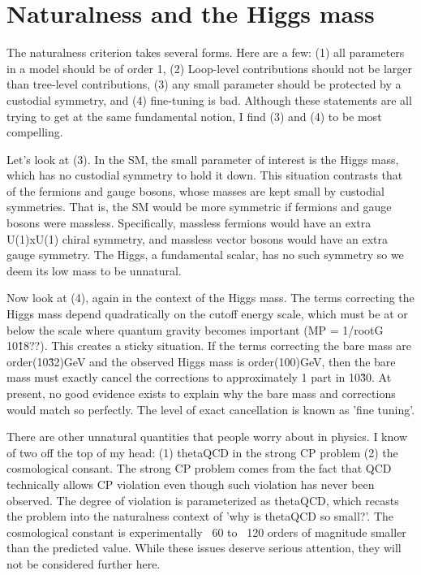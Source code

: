 \documentclass[12pt]{article}
\begin{document}
\section{Naturalness and the Higgs mass}
    The naturalness criterion takes several forms. Here are a few: (1) all parameters in a model should be of order 1, (2) Loop-level contributions should not be larger than tree-level contributions, (3) any small parameter should be protected by a custodial symmetry, and (4) fine-tuning is bad. Although these statements are all trying to get at the same fundamental notion, I find (3) and (4) to be most compelling.

    Let's look at (3). In the SM, the small parameter of interest is the Higgs mass, which has no custodial symmetry to hold it down. This situation contrasts that of the fermions and gauge bosons, whose masses are kept small by custodial symmetries. That is, the SM would be more symmetric if fermions and gauge bosons were massless. Specifically, massless fermions would have an extra U(1)xU(1) chiral symmetry, and massless vector bosons would have an extra gauge symmetry. The Higgs, a fundamental scalar, has no such symmetry so we deem its low mass to be unnatural.

    Now look at (4), again in the context of the Higgs mass. The terms correcting the Higgs mass depend quadratically on the cutoff energy scale, which must be at or below the scale where quantum gravity becomes important (MP = 1/rootG ~ 10\^18??). This creates a sticky situation. If the terms correcting the bare mass are order(10\^32)GeV and the observed Higgs mass is order(100)GeV, then the bare mass must exactly cancel the corrections to approximately 1 part in 10\^30. At present, no good evidence exists to explain why the bare mass and corrections would match so perfectly. The level of exact cancellation is known as 'fine tuning'.

    There are other unnatural quantities that people worry about in physics. I know of two off the top of my head: (1) thetaQCD in the strong CP problem (2) the cosmological consant. The strong CP problem comes from the fact that QCD technically allows CP violation even though such violation has never been observed. The degree of violation is parameterized as thetaQCD, which recasts the problem into the naturalness context of 'why is thetaQCD so small?'. The cosmological constant is experimentally ~60 to ~120 orders of magnitude smaller than the predicted value. While these issues deserve serious attention, they will not be considered further here.
    
\end{document}
